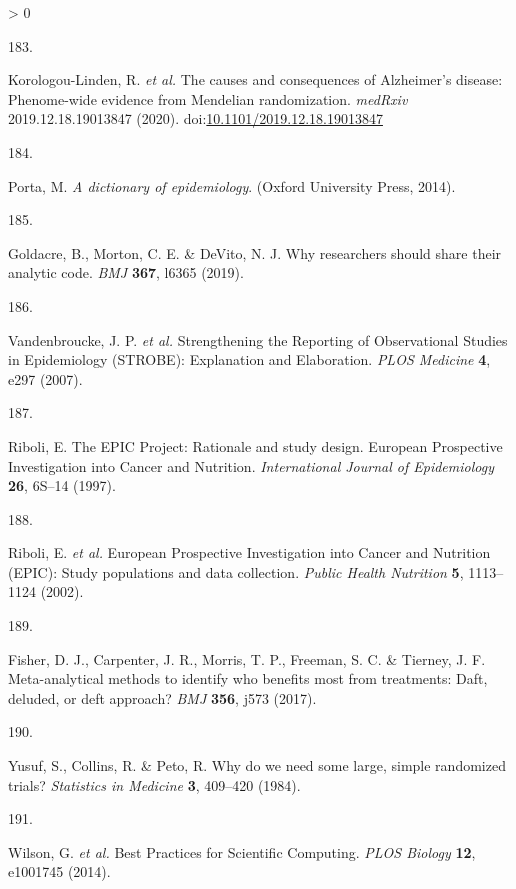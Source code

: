 \documentclass[a4paper, twoside]{templates/ociamthesis}
\newlength{\cslhangindent}
\newlength{\csllabelwidth}
\newenvironment{CSLReferences}[3] %
 {%
  \setlength{\parindent}{0pt}
  \ifodd #1 \everypar{\setlength{\hangindent}{\cslhangindent}}\ignorespaces\fi
  \ifnum #2 > 0
  \setlength{\parskip}{#2\baselineskip}
  \fi
 }%
 {}
\newcommand{\CSLLeftMargin}[1]{\parbox[t]{\maxof{\widthof{#1}}{\csllabelwidth}}{#1}}
\newcommand{\CSLRightInline}[1]{\parbox[t]{\linewidth - \csllabelwidth}{#1}}
\begin{document}
\begin{CSLReferences}{0}{0}
\leavevmode\hypertarget{ref-korologou-linden2020}{}%
\CSLLeftMargin{183. }
\CSLRightInline{Korologou-Linden, R. \emph{et al.} The causes and consequences of {Alzheimer}'s disease: Phenome-wide evidence from {Mendelian} randomization. \emph{medRxiv} 2019.12.18.19013847 (2020). doi:\href{https://doi.org/10.1101/2019.12.18.19013847}{10.1101/2019.12.18.19013847}}

\leavevmode\hypertarget{ref-porta2014dictionary}{}%
\CSLLeftMargin{184. }
\CSLRightInline{Porta, M. \emph{A dictionary of epidemiology}. ({Oxford University Press}, 2014).}

\leavevmode\hypertarget{ref-goldacre2019c}{}%
\CSLLeftMargin{185. }
\CSLRightInline{Goldacre, B., Morton, C. E. \& DeVito, N. J. Why researchers should share their analytic code. \emph{BMJ} \textbf{367}, l6365 (2019).}

\leavevmode\hypertarget{ref-vandenbroucke2007}{}%
\CSLLeftMargin{186. }
\CSLRightInline{Vandenbroucke, J. P. \emph{et al.} Strengthening the {Reporting} of {Observational Studies} in {Epidemiology} ({STROBE}): {Explanation} and {Elaboration}. \emph{PLOS Medicine} \textbf{4}, e297 (2007).}

\leavevmode\hypertarget{ref-riboli1997}{}%
\CSLLeftMargin{187. }
\CSLRightInline{Riboli, E. The {EPIC Project}: Rationale and study design. {European Prospective Investigation} into {Cancer} and {Nutrition}. \emph{International Journal of Epidemiology} \textbf{26}, 6S--14 (1997).}

\leavevmode\hypertarget{ref-riboli2002}{}%
\CSLLeftMargin{188. }
\CSLRightInline{Riboli, E. \emph{et al.} European {Prospective Investigation} into {Cancer} and {Nutrition} ({EPIC}): Study populations and data collection. \emph{Public Health Nutrition} \textbf{5}, 1113--1124 (2002).}

\leavevmode\hypertarget{ref-fisher2017}{}%
\CSLLeftMargin{189. }
\CSLRightInline{Fisher, D. J., Carpenter, J. R., Morris, T. P., Freeman, S. C. \& Tierney, J. F. Meta-analytical methods to identify who benefits most from treatments: Daft, deluded, or deft approach? \emph{BMJ} \textbf{356}, j573 (2017).}

\leavevmode\hypertarget{ref-yusuf1984}{}%
\CSLLeftMargin{190. }
\CSLRightInline{Yusuf, S., Collins, R. \& Peto, R. Why do we need some large, simple randomized trials? \emph{Statistics in Medicine} \textbf{3}, 409--420 (1984).}

\leavevmode\hypertarget{ref-wilson2014}{}%
\CSLLeftMargin{191. }
\CSLRightInline{Wilson, G. \emph{et al.} Best {Practices} for {Scientific Computing}. \emph{PLOS Biology} \textbf{12}, e1001745 (2014).}


\end{CSLReferences}
\end{document}
